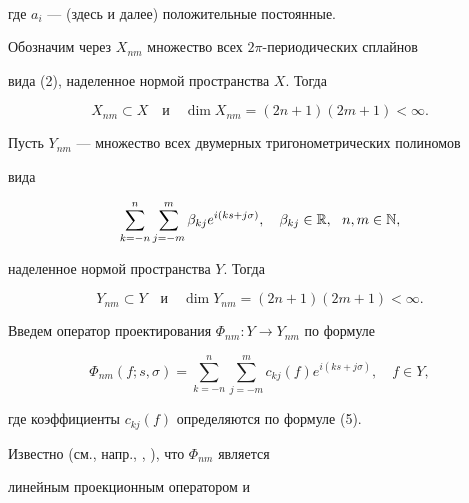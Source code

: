 \begin{pf}
\begin{gather}
\end{gather} 


где $a_i$ --- (здесь и далее) положительные постоянные. 


 


Обозначим через $X_{n m}$ множество всех $2\pi$-периодических сплайнов 


вида (2), наделенное нормой пространства $X$. Тогда 


\begin{equation} 


X_{n m}\subset X\quad \text{и} \quad \dim X_{n m}= 


(2n+1)(2m+1)<\infty. 


\end{equation} 


Пусть $Y_{n m}$ --- множество всех двумерных тригонометрических полиномов 


вида 


$$ 


\sum^n_{k=-n}\sum^m_{j=-m}\beta_{k j}e^{i(k s+j\sigma)},\quad 


\beta_{k j}\in\Bbb R,\ \ n,m\in\Bbb N, 


$$ 


наделенное нормой пространства $Y$. Тогда 


\begin{equation} 


Y_{n m}\subset Y\quad\text{и}\quad \dim Y_{n m}= 


(2n+1)(2m+1)<\infty. 


\end{equation} 


Введем оператор проектирования $\Phi_{n m}:Y\to Y_{n m}$ по формуле 


\begin{equation} 


\Phi_{n m}(f;s,\sigma)=\sum^n_{k=-n}\sum^m_{j=-m} 


c_{k j}(f)e^{i(k s+j\sigma)},\quad f\in Y, 


\end{equation} 


где коэффициенты $c_{k j}(f)$ определяются по формуле (5). 


 


Известно (см., напр., \cite{7}, \cite{8}), что $\Phi_{n m}$ является 


линейным проекционным оператором и 


\begin{equation} 



\end{equation}
\end{pf}
